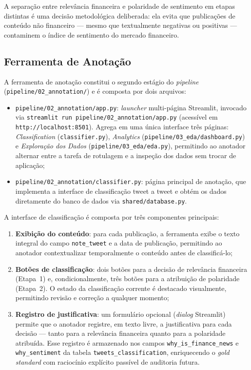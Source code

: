 A separação entre relevância financeira e polaridade de sentimento em etapas distintas é uma decisão metodológica deliberada: ela evita que publicações de conteúdo não financeiro — mesmo que textualmente negativas ou positivas — contaminem o índice de sentimento do mercado financeiro.

\subsection{Ferramenta de Anotação}
\label{subsec:ferramenta_anotacao}

A ferramenta de anotação constitui o segundo estágio do \textit{pipeline} (\texttt{pipeline/02\_annotation/}) e é composta por dois arquivos:

\begin{itemize}
	\item \texttt{pipeline/02\_annotation/app.py}: \textit{launcher} multi-página Streamlit, invocado via \texttt{streamlit run pipeline/02\_annotation/app.py} (acessível em \texttt{http://localhost:8501}). Agrega em uma única interface três páginas: \textit{Classification} (\texttt{classifier.py}), \textit{Analytics} (\texttt{pipeline/03\_eda/dashboard.py}) e \textit{Exploração dos Dados} (\texttt{pipeline/03\_eda/eda.py}), permitindo ao anotador alternar entre a tarefa de rotulagem e a inspeção dos dados sem trocar de aplicação;
	
	\item \texttt{pipeline/02\_annotation/classifier.py}: página principal de anotação, que implementa a interface de classificação tweet a tweet e obtém os dados diretamente do banco de dados via
	\texttt{shared/database.py}.
\end{itemize}

A interface de classificação é composta por três componentes principais:

\begin{enumerate}
	\item \textbf{Exibição do conteúdo}: para cada publicação, a ferramenta exibe o texto integral do campo \texttt{note\_tweet} e a data de publicação, permitindo ao anotador contextualizar
	temporalmente o conteúdo antes de classificá-lo;
	
	\item \textbf{Botões de classificação}: dois botões para a decisão de relevância financeira (Etapa~1) e, condicionalmente, três botões para a atribuição de polaridade (Etapa~2). O estado da classificação corrente é destacado visualmente, permitindo revisão e correção a qualquer momento;
	
	\item \textbf{Registro de justificativa}: um formulário opcional (\textit{dialog} Streamlit) permite que o anotador registre, em texto livre, a justificativa para cada decisão — tanto para a relevância financeira quanto para a polaridade atribuída. Esse registro é armazenado nos campos \texttt{why\_is\_finance\_news} e \texttt{why\_sentiment} da tabela \texttt{tweets\_classification}, enriquecendo o \textit{gold standard} com raciocínio explícito passível de auditoria futura.
\end{enumerate}

